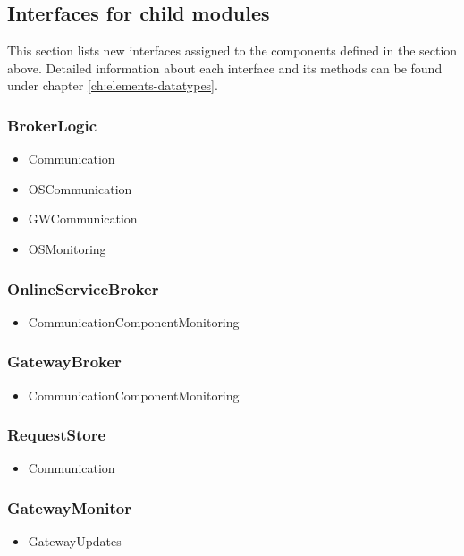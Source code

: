 \subsection{Interfaces for child modules}
    This section lists new interfaces assigned to the components defined
    in the section above. Detailed information about each interface and
    its methods can be found under chapter \ref{ch:elements-datatypes}. \\

    \subsubsection{BrokerLogic}
        \begin{itemize}
            \item Communication
            \item OSCommunication
            \item GWCommunication
            \item OSMonitoring
        \end{itemize}

    \subsubsection{OnlineServiceBroker}
        \begin{itemize}
            \item CommunicationComponentMonitoring
        \end{itemize}

    \subsubsection{GatewayBroker}
        \begin{itemize}
            \item CommunicationComponentMonitoring
        \end{itemize}

    \subsubsection{RequestStore}
        \begin{itemize}
            \item Communication
        \end{itemize}

    \subsubsection{GatewayMonitor}
        \begin{itemize}
            \item GatewayUpdates
        \end{itemize}


